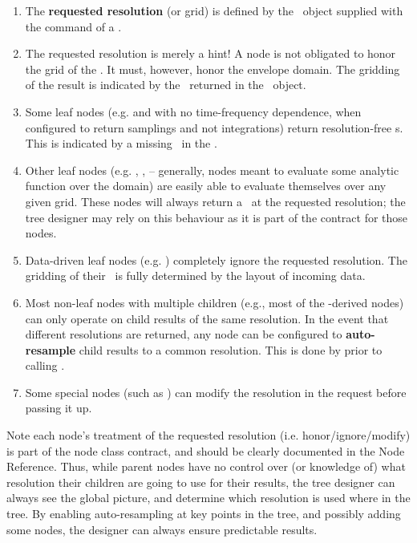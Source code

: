   \begin{enumerate}
  
  \item The {\bf requested resolution} (or grid) is defined by the \Cells\
  object supplied with the  command of a \Request.

  \item The requested resolution is merely a hint! A node is not obligated to
  honor the grid of the \Cells. It must, however, honor the envelope domain.
  The gridding of the result is indicated by the \Cells\ returned in the
  \Result\ object.
  
  \item Some leaf nodes (e.g.  and  with no time-frequency
  dependence, when configured to return samplings and not integrations) return
  resolution-free \Result{}s. This is indicated by a missing \Cells\ in the
  \Result. 

  \item Other leaf nodes (e.g. , ,  -- generally,
  nodes meant to evaluate some analytic function over the domain) are easily
  able to evaluate themselves over any given grid. These nodes will always
  return a \Result\ at the requested resolution; the tree designer may rely on
  this behaviour as it is part of the contract for those nodes.

  \item Data-driven leaf nodes (e.g. ) completely ignore the
  requested resolution. The gridding of their \Result\ is fully determined by
  the layout of incoming data.

  \item Most non-leaf nodes with multiple children (e.g., most of the
  \qq{Function}-derived nodes) can only operate on child results of the same
  resolution. In the event that different resolutions are returned, any node
  can be configured to {\bf auto-resample} child results to a common
  resolution. This is done by \qq{Node::execute()} prior to calling
  \qq{getResult()}.

  \item Some special nodes (such as ) can modify the resolution in
  the request before passing it up.
  
  \end{enumerate}
  
  Note each node's treatment of the requested resolution (i.e.
  honor/ignore/modify) is part of the node class contract, and should be
  clearly documented in the Node Reference. Thus, while parent nodes have no
  control over (or knowledge of) what resolution their children are going to
  use for their results, the tree designer can always see the global picture,
  and determine which resolution is used where in the tree. By enabling
  auto-resampling at key points in the tree, and possibly adding some
  \qq{ModRes} nodes, the designer can always ensure predictable results.
  
